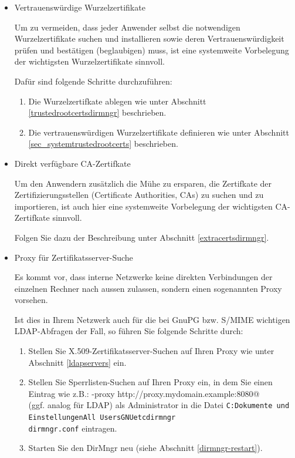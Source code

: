 \documentclass[a4paper,11pt, oneside,openright,titlepage,dvips]{scrbook}
\newcommand{\Filename}[1]{\texttt{#1}}
\begin{document}
\begin{itemize}
\item Vertrauenswürdige Wurzelzertifikate

    Um zu vermeiden, dass jeder Anwender selbst die notwendigen
    Wurzelzertifikate suchen und installieren sowie deren Vertrauenswürdigkeit
    prüfen und bestätigen (beglaubigen) muss, ist eine systemweite Vorbelegung der
    wichtigsten Wurzelzertifikate sinnvoll.

    Dafür sind folgende Schritte durchzuführen:
    \begin{enumerate}
    \item Die Wurzelzertifkate ablegen wie unter Abschnitt \ref{trustedrootcertsdirmngr}
    beschrieben.
    \item Die vertrauenswürdigen Wurzelzertifikate definieren wie unter
        Abschnitt \ref{sec_systemtrustedrootcerts}
    beschrieben.
    \end{enumerate}

\item Direkt verfügbare CA-Zertifkate

    Um den Anwendern zusätzlich die Mühe zu ersparen, die Zertifkate der Zertifizierungsstellen
    (Certificate Authorities, CAs) zu suchen und zu importieren, ist auch hier
    eine systemweite Vorbelegung der wichtigsten CA-Zertifkate sinnvoll.

    Folgen Sie dazu der Beschreibung unter Abschnitt
    \ref{extracertsdirmngr}.


\item Proxy für Zertifikatsserver-Suche

    Es kommt vor, dass interne Netzwerke keine direkten Verbindungen der einzelnen
    Rechner nach aussen zulassen, sondern einen sogenannten Proxy vorsehen.

    Ist dies in Ihrem Netzwerk auch für die bei GnuPG bzw. S/MIME wichtigen
    LDAP-Abfragen der Fall, so führen Sie folgende Schritte durch:

    \begin{enumerate}
    \item Stellen Sie X.509-Zertifikatsserver-Suchen auf Ihren Proxy wie unter Abschnitt
        \ref{ldapservers} ein.
    \item Stellen Sie Sperrlisten-Suchen auf Ihren Proxy ein, in dem Sie einen Eintrag
        wie z.B.:
        \small
        \verb@http-proxy http://proxy.mydomain.example:8080@\\
        \normalsize
        (ggf. analog für LDAP) als Administrator in die Datei\newline
        \small
        \Filename{C:\back{}Dokumente und Einstellungen\back{}All
        Users\back{}GNU\back{}etc\back{}dirmngr\back{}\\ dirmngr.conf}\newline
        \normalsize
        eintragen.
    \item Starten Sie den DirMngr neu (siehe Abschnitt \ref{dirmngr-restart}).
\end{enumerate}
\end{itemize}
\end{document}
